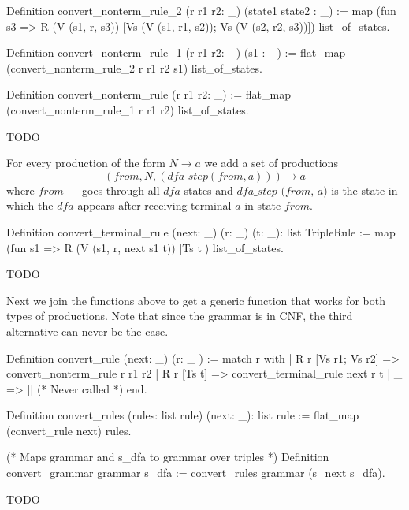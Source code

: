 \begin{listing}[h]
    \begin{pyglist}[language=coq, numbers=none, numbersep=5pt]
  Definition convert_nonterm_rule_2 
    (r r1 r2: _) 
    (state1 state2 : _) :=
    map (fun s3 => R (V (s1, r, s3)) 
                     [Vs (V (s1, r1, s2)); 
                      Vs (V (s2, r2, s3))])
      list_of_states.

  Definition convert_nonterm_rule_1  
               (r r1 r2: _) 
               (s1 : _) :=
    flat_map (convert_nonterm_rule_2 r r1 r2 s1) 
             list_of_states.

  Definition convert_nonterm_rule (r r1 r2: _) :=
    flat_map (convert_nonterm_rule_1 r r1 r2) 
             list_of_states.
    \end{pyglist}
    \caption{TODO}
    \label{lst:verbments1}
\end{listing}

For every production of the form $N \to a$ we add a set of productions $$(\textit{from}, N, (\textit{dfa\_step}(\textit{from}, a))) \to a$$ where $\textit{from}$ --- goes through all $\textit{dfa}$ states and $\textit{dfa\_step (from, a)}$ is the state in which the $\textit{dfa}$ appears after receiving terminal $a$ in state $\textit{from}$.

\begin{listing}[h]
    \begin{pyglist}[language=coq, numbers=none, numbersep=5pt]
  Definition convert_terminal_rule 
              (next: _) 
              (r: _) 
              (t: _): list TripleRule :=
    map (fun s1 => R (V (s1, r, next s1 t)) 
	               [Ts t]) 
        list_of_states.
    \end{pyglist}
    \caption{TODO}
    \label{lst:verbments1}
\end{listing}

Next we join the functions above to get a generic function that works for both types of productions. 
Note that since the grammar is in CNF, the third alternative can never be the case.

\begin{listing}[h]
    \begin{pyglist}[language=coq, numbers=none, numbersep=5pt]
  Definition convert_rule (next: _) (r: _ ) :=
    match r with
    | R r [Vs r1; Vs r2] => 
        convert_nonterm_rule r r1 r2
    | R r [Ts t] => 
        convert_terminal_rule next r t 
    | _  => []   (* Never called *)
    end.
        
  Definition convert_rules 
    (rules: list rule) (next: _): list rule :=
    flat_map (convert_rule next) rules.
    
  (* Maps grammar and s_dfa 
     to grammar over triples *)
  Definition convert_grammar grammar s_dfa :=
    convert_rules grammar (s_next s_dfa). 
    \end{pyglist}
    \caption{TODO}
    \label{lst:verbments1}
\end{listing}

